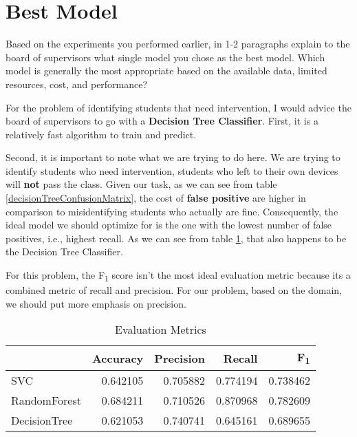 \documentclass[12pt]{article}
\begin{document}

\section*{Best Model}
Based on the experiments you performed earlier, in 1-2 paragraphs explain to the board of supervisors what single model you chose as the best model. Which model is generally the most appropriate based on the available data, limited resources, cost, and performance?

For the problem of identifying students that need intervention, I would advice the board of supervisors to go with a \textbf{Decision Tree Classifier}. First, it is a relatively fast algorithm to train and predict. 

Second, it is important to note what we are trying to do here. We are trying to identify students who need intervention, students who left to their own devices will \textbf{not} pass the class. Given our task, as we can see from table \ref{decisionTreeConfusionMatrix}, the cost of \textbf{false positive} are higher in comparison to misidentifying students who actually are fine. Consequently, the ideal model we should optimize for is the one with the lowest number of false positives, i.e., highest recall. As we can see from table \ref{scoresTable}, that also happens to be the Decision Tree Classifier. 

For this problem, the F\textsubscript{1} score isn't the most ideal evaluation metric because its a combined metric of recall and precision. For our problem, based on the domain, we should put more emphasis on precision.

\setlength{\extrarowheight}{1.5pt}
\begin{table}[!htbp]
\caption{Evaluation Metrics} %
\centering %
\begin{tabular}{|l|r|r|r|r|} %
\hline %
& Accuracy & Precision & Recall & F\textsubscript{1}\\[0.5ex]
\hline %
SVC           & 0.642105   & 0.705882  & 0.774194  & 0.738462\\
RandomForest  & 0.684211   & 0.710526  & 0.870968  & 0.782609\\
DecisionTree  & 0.621053   & 0.740741  & 0.645161  & 0.689655\\
\hline %
\end{tabular}
\label{scoresTable}
\end{table}
\end{document}
